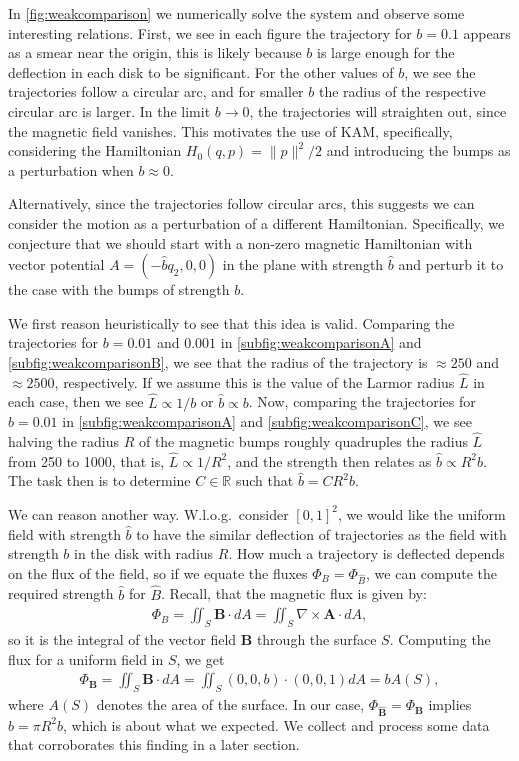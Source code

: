 In \cref{fig:weakcomparison} we numerically solve the system and observe some interesting relations. First, we see in each figure the trajectory for $b=0.1$ appears as a smear near the origin, this is likely because $b$ is large enough for the deflection in each disk to be significant. For the other values of $b$, we see the trajectories follow a circular arc, and for smaller $b$ the radius of the respective circular arc is larger. In the limit $b\to0$, the trajectories will straighten out, since the magnetic field vanishes. This motivates the use of KAM, specifically, considering the Hamiltonian $H_0(q,p)=\|p\|^2/2$ and introducing the bumps as a perturbation when $b\approx0$.

Alternatively, since the trajectories follow circular arcs, this suggests we can consider the motion as a perturbation of a different Hamiltonian. Specifically, we conjecture that we should start with a non-zero magnetic Hamiltonian with vector potential $A=(-\hat bq_2,0,0)$ in the plane with strength $\hat b$ and perturb it to the case with the bumps of strength $b$.

We first reason heuristically to see that this idea is valid. Comparing the trajectories for $b=0.01$ and $ 0.001$ in \cref{subfig:weakcomparisonA} and \ref{subfig:weakcomparisonB}, we see that the radius of the trajectory is $\approx250$ and $\approx2500$, respectively. If we assume this is the value of the Larmor radius $\hat L$ in each case, then we see $\hat L\varpropto 1/b$ or $\hat b\varpropto b$. Now, comparing the trajectories for $b=0.01$ in \cref{subfig:weakcomparisonA} and \ref{subfig:weakcomparisonC}, we see halving the radius $R$ of the magnetic bumps roughly quadruples the radius $\hat L$ from 250 to 1000, that is, $\hat L\varpropto 1/R^2$, and the strength then relates as $\hat b \varpropto R^2b$. The task then is to determine $C\in\mathbb R$ such that $\hat b = CR^2b$.

We can reason another way. W.l.o.g.~consider $[0,1]^2$, we would like the uniform field with strength $\hat b$ to have the similar deflection of trajectories as the field with strength $b$ in the disk with radius $R$. How much a trajectory is deflected depends on the flux of the field, so if we equate the fluxes $\Phi_{B}=\Phi_{\hat B}$, we can compute the required strength $\hat b$ for $\hat B$. Recall, that the magnetic flux is given by:
\begin{align*}
\Phi_B = \iint_{S}\mathbf B\cdot dA = \iint_{S}\nabla\times \mathbf A\cdot dA,
\end{align*}
so it is the integral of the vector field $\mathbf B$ through the surface $S$. Computing the flux for a uniform field in $S$, we get
\begin{align*}
\Phi_{\mathbf B} = \iint_{S}\mathbf B\cdot dA
  = \iint_{S}(0,0,b)\cdot (0,0,1) dA = b A(S), 
\end{align*}
where $A(S)$ denotes the area of the surface. In our case, $\Phi_{\hat{\mathbf B}}=\Phi_{\mathbf B}$ implies $\hat b = \pi R^2 b$, which is about what we expected. We collect and process some data that corroborates this finding in a later section.